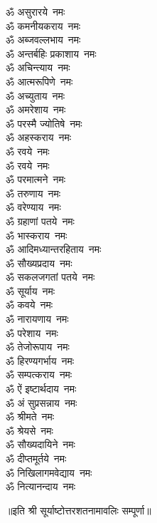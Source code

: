 \begin{multicols}{2}
\begin{flushleft}
        ॐ असुरारये~नमः\\
        ॐ कमनीयकराय~नमः\\
        ॐ अब्जवल्लभाय~नमः\\
        ॐ अन्तर्बहिः प्रकाशाय~नमः\\
        ॐ अचिन्त्याय~नमः\\
        ॐ आत्मरूपिणे~नमः\\
        ॐ अच्युताय~नमः\hfill{}\\
        ॐ अमरेशाय~नमः\\
        ॐ परस्मै ज्योतिषे~नमः\\
        ॐ अहस्कराय~नमः\\
        ॐ रवये~नमः\\
        ॐ रवये~नमः\\
        ॐ परमात्मने~नमः\\
        ॐ तरुणाय~नमः\\
        ॐ वरेण्याय~नमः\\
        ॐ ग्रहाणां पतये~नमः\\
        ॐ भास्कराय~नमः\hfill{}\\
        ॐ आदिमध्यान्तरहिताय~नमः\\
        ॐ सौख्यप्रदाय~नमः\\
        ॐ सकलजगतां पतये~नमः\\
        ॐ सूर्याय~नमः\\
        ॐ कवये~नमः\\
        ॐ नारायणाय~नमः\\
        ॐ परेशाय~नमः\\
        ॐ तेजोरूपाय~नमः\\
        ॐ हिरण्यगर्भाय~नमः\\
        ॐ सम्पत्कराय~नमः\hfill{}\\
        ॐ ऐं इष्टार्थदाय~नमः\\
        ॐ अं सुप्रसन्नाय~नमः\\
        ॐ श्रीमते~नमः\\
        ॐ श्रेयसे~नमः\\
        ॐ सौख्यदायिने~नमः\\
        ॐ दीप्तमूर्तये~नमः\\
        ॐ निखिलागमवेद्याय~नमः\\
        ॐ नित्यानन्दाय~नमः\hfill{}\\
    \end{flushleft}
\end{multicols}
॥इति श्री सूर्याष्टोत्तरशतनामावलिः सम्पूर्णा॥

